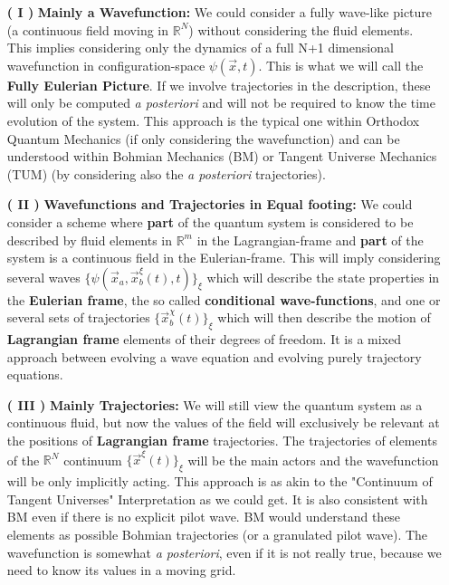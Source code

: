 \documentclass[11pt, a4paper]{article} %
\newcommand{\R}{\mathbb{R}} %
\begin{document}
\begin{enumerate}
\item[\bf ( I )] {\bf Mainly a Wavefunction: } We could consider a fully wave-like picture (a continuous field moving in $\R^N$) without considering the fluid elements. This implies considering only the dynamics of a full N+1 dimensional wavefunction in configuration-space $\psi(\vec{x},t)$. This is what we will call the {\bf Fully Eulerian Picture}. If we involve trajectories in the description, these will only be computed {\em a posteriori} and will not be required to know the time evolution of the system. This approach is the typical one within Orthodox Quantum Mechanics (if only considering the wavefunction) and can be understood within Bohmian Mechanics (BM) or Tangent Universe Mechanics (TUM) (by considering also the {\em a posteriori} trajectories).

\item[{\bf ( II )}]{\bf Wavefunctions and Trajectories in Equal footing: } We could consider a scheme where {\bf part} of the quantum system is considered to be described by fluid elements in $\R^m$ in the Lagrangian-frame and {\bf part} of the system is a continuous field in the Eulerian-frame. This will imply considering several waves $\{ \psi(\vec{x}_a, \vec{x}_b^\xi(t), t) \}_\xi$ which will describe the state properties in the {\bf Eulerian frame}, the so called {\bf conditional wave-functions}, and one or several sets of trajectories $\{\vec{x}_b^\chi(t)\}_\xi$ which will then describe the motion of {\bf Lagrangian frame} elements of their degrees of freedom. It is a mixed approach between evolving a wave equation and evolving purely trajectory equations.

\item[\bf ( III )]{\bf Mainly Trajectories:} We will still view the quantum system as a continuous fluid, but now the values of the field will exclusively be relevant at the positions of {\bf Lagrangian frame} trajectories. The trajectories of elements of the $\R^N$ continuum $\{\vec{x}^\xi(t)\}_\xi$ will be the main actors and the wavefunction will be only implicitly acting. This approach is as akin to the "Continuum of Tangent Universes" Interpretation as we could get. It is also consistent with BM even if there is no explicit pilot wave. BM would understand these elements as possible Bohmian trajectories (or a granulated pilot wave). The wavefunction is somewhat {\em a posteriori}, even if it is not really true, because we need to know its values in a moving grid.


\end{enumerate}
\end{document}
